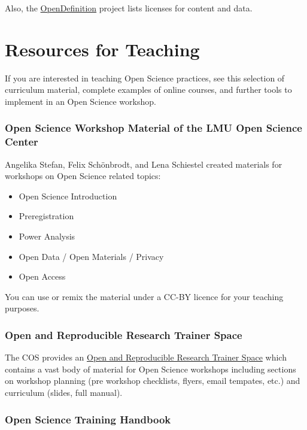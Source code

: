 \documentclass[12pt,]{report}
\providecommand{\tightlist}{%
  \setlength{\itemsep}{0pt}\setlength{\parskip}{0pt}}
\begin{document}
Also, the \href{http://opendefinition.org/licenses/}{OpenDefinition}
project lists licenses for content and data.

\hypertarget{res_teaching}{\chapter{Resources for
Teaching}\label{res_teaching}}

If you are interested in teaching Open Science practices, see this
selection of curriculum material, complete examples of online courses,
and further tools to implement in an Open Science workshop.

\subsection{Open Science Workshop Material of the LMU Open Science
Center}\label{open-science-workshop-material-of-the-lmu-open-science-center}

\href{https://osf.io/zjrhu/}{}

Angelika Stefan, Felix Schönbrodt, and Lena Schiestel created materials
for workshops on Open Science related topics:

\begin{itemize}
\tightlist
\item
  Open Science Introduction
\item
  Preregistration
\item
  Power Analysis
\item
  Open Data / Open Materials / Privacy
\item
  Open Access
\end{itemize}

You can use or remix the material under a CC-BY licence for your
teaching purposes.

\subsection{Open and Reproducible Research Trainer
Space}\label{open-and-reproducible-research-trainer-space}

The COS provides an \href{https://osf.io/qsb2c/}{Open and Reproducible
Research Trainer Space} which contains a vast body of material for Open
Science workshops including sections on workshop planning (pre workshop
checklists, flyers, email tempates, etc.) and curriculum (slides, full
manual).

\subsection{Open Science Training
Handbook}\label{open-science-training-handbook}
\end{document}
